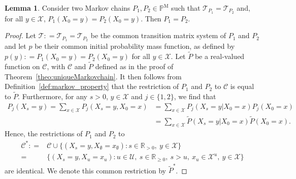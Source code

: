 \documentclass[10pt,a4paper]{paper}
\theoremstyle{definition}
\newtheorem{lemma}[theorem]{Lemma}
\newcommand{\reals}{\mathbb{R}}
\newcommand{\states}{\mathcal{X}}
\newcommand{\processes}{\mathbb{P}}
\newcommand{\mprocesses}{\processes^{\mathrm{M}}}
\newcommand{\coloneqq}{:\!=}
\begin{document}
\begin{lemma}\label{lemma:samepandTissameP}
Consider two Markov chains $P_1,P_2\in\mprocesses$ such that $\mathcal{T}_{P_1}=\mathcal{T}_{P_2}$ and, for all $y\in\states$, $P_1(X_0=y)=P_2(X_0=y)$. Then $P_1=P_2$.
\end{lemma}
\begin{proof}
Let $\mathcal{T}\coloneqq\mathcal{T}_{P_1}=\mathcal{T}_{P_2}$ be the common transition matrix system of $P_1$ and $P_2$ and let $p$ be their common initial probability mass function, as defined by $p(y)\coloneqq P_1(X_0=y)=P_2(X_0=y)$ for all $y\in\states$. Let $\tilde{P}$ be a real-valued function on $\mathcal{C}$, with $\mathcal{C}$ and $\tilde{P}$ defined as in the proof of Theorem~\ref{theo:uniqueMarkovchain}. It then follows from Definition~\ref{def:markov_property} that the restriction of $P_1$ and $P_2$ to $\mathcal{C}$ is equal to $\tilde{P}$. Furthermore, for any $s>0$, $y\in\states$ and $j\in\{1,2\}$, we find that
\begin{align*}
P_j(X_s=y)
=\sum_{x\in\states}P_j(X_s=y, X_0=x)
&=\sum_{x\in\states}P_j(X_s=y\vert X_0=x)P_j(X_0=x)\\
&=\sum_{x\in\states}\tilde{P}(X_s=y\vert X_0=x)\tilde{P}(X_0=x).
\end{align*}
Hence, the restrictions of $P_1$ and $P_2$ to
\begin{align*}
\mathcal{C}^*
\coloneqq&\mathcal{C}\cup
\{
(X_s=y,X_\emptyset=x_\emptyset)
\colon 
s\in\reals_{>0},~y\in\states
\}\\
=&\{
(X_s=y,X_u=x_u)
\colon 
u\in\mathcal{U},~s\in\reals_{\geq0},~s>u,~x_u\in\states^u,~y\in\states
\}
\end{align*}
are identical. We denote this common restriction by $\tilde{P}^*$.


\end{proof}
\end{document}
